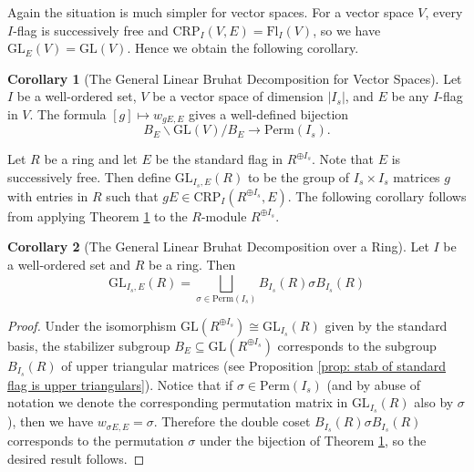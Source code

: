 \documentclass[oneside,11pt]{amsart}
\newcommand{\CRP}{\ensuremath{\text{CRP}}}
\newcommand{\GL}{\ensuremath{\text{GL}}}
\newcommand{\Fl}{\ensuremath{\text{Fl}}}
\newcommand{\Perm}{\ensuremath{\text{Perm}}}
\theoremstyle{definition}
\newtheorem{proof techniques}{Proof Techniques}
\newtheorem{corollary}{Corollary}
\begin{document}
Again the situation is much simpler for vector spaces. For a vector space $V$, every $I$-flag is successively free and $\CRP_I(V , E) = \Fl_I(V)$, so we have $\GL_E(V) = \GL(V)$. Hence we obtain the following corollary. 

\begin{corollary}[The General Linear Bruhat Decomposition for Vector Spaces]\label{thm: the general linear bruhat decomposition}
Let $I$ be a well-ordered set, $V$ be a vector space of dimension $|I_s|$, and $E$ be any $I$-flag in $V$. The formula $[g] \mapsto w_{gE , E}$ gives a well-defined bijection 
\begin{equation*}
B_E \backslash \GL(V) / B_E \to \Perm(I_s). 
\end{equation*}
\end{corollary}

Let $R$ be a ring and let $E$ be the standard flag in $R^{\oplus I_s}$. Note that $E$ is successively free. Then define $\GL_{I_s , E}(R)$ to be the group of $I_s \times I_s$ matrices $g$ with entries in $R$ such that $g E \in \CRP_I(R^{\oplus I_s} , E)$. The following corollary follows from applying Theorem \ref{thm: the general linear bruhat decomposition} to the $R$-module $R^{\oplus I_s}$. 

\begin{corollary}[The General Linear Bruhat Decomposition over a Ring]\label{cor: the general linear bruhat decomposition over a ring}
Let $I$ be a well-ordered set and $R$ be a ring. Then 
\begin{equation*}
\GL_{I_s, E}(R) = \bigsqcup_{\sigma \in \Perm(I_s)} B_{I_s}(R) \sigma B_{I_s}(R)
\end{equation*}
\end{corollary}

\begin{proof}
Under the isomorphism $\GL(R^{\oplus I_s}) \cong \GL_{I_s}(R)$ given by the standard basis, the stabilizer subgroup $B_E \subseteq \GL(R^{\oplus I_s})$ corresponds to the subgroup $B_{I_s}(R)$ of upper triangular matrices (see Proposition \ref{prop: stab of standard flag is upper triangulars}). Notice that if $\sigma \in \Perm(I_s)$ (and by abuse of notation we denote the corresponding permutation matrix in $\GL_{I_s}(R)$ also by $\sigma$), then we have $w_{\sigma E , E} = \sigma$. Therefore the double coset $B_{I_s}(R) \sigma B_{I_s}(R)$ corresponds to the permutation $\sigma$ under the bijection of Theorem \ref{thm: the general linear bruhat decomposition}, so the desired result follows. 
\end{proof}
\end{document}
